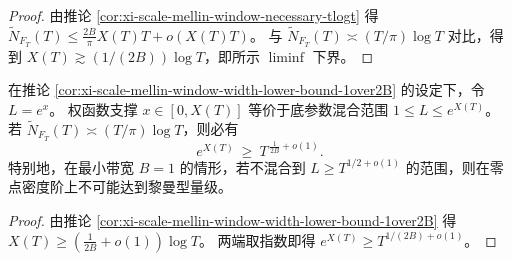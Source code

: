 \begin{proof}
由推论 \ref{cor:xi-scale-mellin-window-necessary-tlogt} 得
\(
\widetilde N_{F_T}(T)\le \frac{2B}{\pi}X(T)T+o(X(T)T)
\)。
与 \(\widetilde N_{F_T}(T)\asymp (T/\pi)\log T\) 对比，得到 \(X(T)\gtrsim (1/(2B))\log T\)，即所示 \(\liminf\) 下界。
\end{proof}

\begin{corollary}\label{cor:xi-scale-mellin-base-range-threshold}
在推论 \ref{cor:xi-scale-mellin-window-width-lower-bound-1over2B} 的设定下，令 \(L=e^{x}\)。
权函数支撑 \(x\in[0,X(T)]\) 等价于底参数混合范围
\(
1\le L\le e^{X(T)}
\)。
若 \(\widetilde N_{F_T}(T)\asymp (T/\pi)\log T\)，则必有
\[
e^{X(T)}\ \ge\ T^{\,\frac{1}{2B}+o(1)}.
\]
特别地，在最小带宽 \(B=1\) 的情形，若不混合到 \(L\ge T^{1/2+o(1)}\) 的范围，则在零点密度阶上不可能达到黎曼型量级。
\end{corollary}

\begin{proof}
由推论 \ref{cor:xi-scale-mellin-window-width-lower-bound-1over2B} 得 \(X(T)\ge (\frac{1}{2B}+o(1))\log T\)。
两端取指数即得 \(e^{X(T)}\ge T^{1/(2B)+o(1)}\)。
\end{proof}
